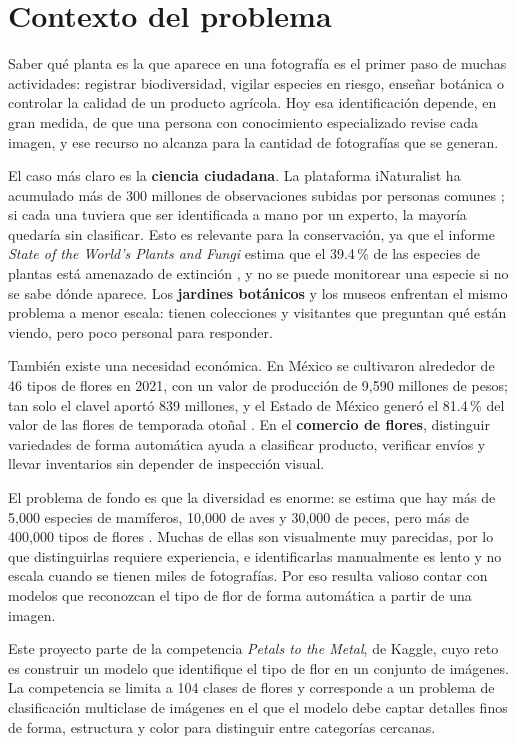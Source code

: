 \section{Contexto del problema}

Saber qué planta es la que aparece en una fotografía es el primer paso de muchas actividades: registrar biodiversidad, vigilar especies en riesgo, enseñar botánica o controlar la calidad de un producto agrícola. Hoy esa identificación depende, en gran medida, de que una persona con conocimiento especializado revise cada imagen, y ese recurso no alcanza para la cantidad de fotografías que se generan.

El caso más claro es la \textbf{ciencia ciudadana}. La plataforma iNaturalist ha acumulado más de 300 millones de observaciones subidas por personas comunes \parencite{inaturalist}; si cada una tuviera que ser identificada a mano por un experto, la mayoría quedaría sin clasificar. Esto es relevante para la conservación, ya que el informe \textit{State of the World's Plants and Fungi} estima que el 39.4\,\% de las especies de plantas está amenazado de extinción \parencite{kew2020}, y no se puede monitorear una especie si no se sabe dónde aparece. Los \textbf{jardines botánicos} y los museos enfrentan el mismo problema a menor escala: tienen colecciones y visitantes que preguntan qué están viendo, pero poco personal para responder.

También existe una necesidad económica. En México se cultivaron alrededor de 46 tipos de flores en 2021, con un valor de producción de 9,590 millones de pesos; tan solo el clavel aportó 839 millones, y el Estado de México generó el 81.4\,\% del valor de las flores de temporada otoñal \parencite{siap2022}. En el \textbf{comercio de flores}, distinguir variedades de forma automática ayuda a clasificar producto, verificar envíos y llevar inventarios sin depender de inspección visual.

El problema de fondo es que la diversidad es enorme: se estima que hay más de 5,000 especies de mamíferos, 10,000 de aves y 30,000 de peces, pero más de 400,000 tipos de flores \parencite{kagglePetalsMetal}. Muchas de ellas son visualmente muy parecidas, por lo que distinguirlas requiere experiencia, e identificarlas manualmente es lento y no escala cuando se tienen miles de fotografías. Por eso resulta valioso contar con modelos que reconozcan el tipo de flor de forma automática a partir de una imagen.

Este proyecto parte de la competencia \textit{Petals to the Metal}, de Kaggle, cuyo reto es construir un modelo que identifique el tipo de flor en un conjunto de imágenes. La competencia se limita a 104 clases de flores y corresponde a un problema de clasificación multiclase de imágenes en el que el modelo debe captar detalles finos de forma, estructura y color para distinguir entre categorías cercanas.

